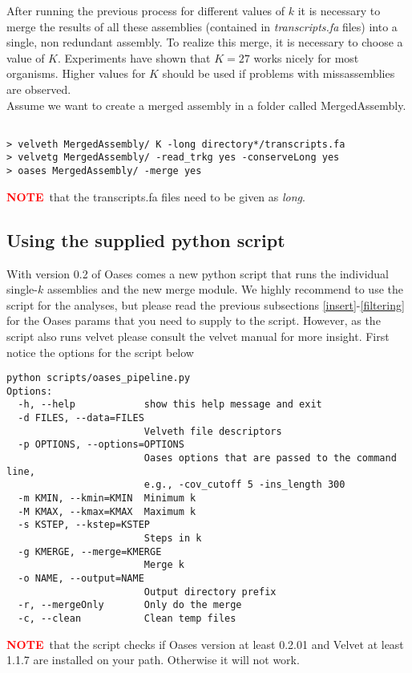 \documentclass[12pt]{article}
\newcommand{\NOTE}{\textcolor{red}{\textbf{NOTE}}}
\begin{document}
After running the previous process for different values of $k$ it is necessary to merge the results of all these assemblies (contained in \emph{transcripts.fa} files) into a single, non redundant assembly. To realize this merge, it is necessary to choose a value of $K$. Experiments have shown that $K=27$ works nicely for most organisms. Higher values for $K$ should be used if problems with missassemblies are observed. \\
 Assume we want to create a merged assembly in a folder called MergedAssembly.
\begin{verbatim}

> velveth MergedAssembly/ K -long directory*/transcripts.fa
> velvetg MergedAssembly/ -read_trkg yes -conserveLong yes
> oases MergedAssembly/ -merge yes
\end{verbatim}
\NOTE \ that the transcripts.fa files need to be given as \emph{long}. \\

\subsection{Using the supplied python script}
With version 0.2 of Oases comes a new python script that runs the individual single-$k$ assemblies and the new merge module. We highly recommend to use the script for the analyses, but please read the previous subsections \ref{insert}-\ref{filtering} for the Oases params that you need to supply to the script.  However, as the script also runs velvet please consult the velvet manual for more insight.
First notice the options for the script below \

\begin{verbatim}
python scripts/oases_pipeline.py
Options:
  -h, --help            show this help message and exit
  -d FILES, --data=FILES
                        Velveth file descriptors
  -p OPTIONS, --options=OPTIONS
                        Oases options that are passed to the command line,
                        e.g., -cov_cutoff 5 -ins_length 300
  -m KMIN, --kmin=KMIN  Minimum k
  -M KMAX, --kmax=KMAX  Maximum k
  -s KSTEP, --kstep=KSTEP
                        Steps in k
  -g KMERGE, --merge=KMERGE
                        Merge k
  -o NAME, --output=NAME
                        Output directory prefix
  -r, --mergeOnly       Only do the merge
  -c, --clean           Clean temp files
\end{verbatim}

\NOTE \ that the script checks if Oases version at least 0.2.01 and Velvet at least 1.1.7 are installed on your path. Otherwise it will not work.
 
\end{document}
